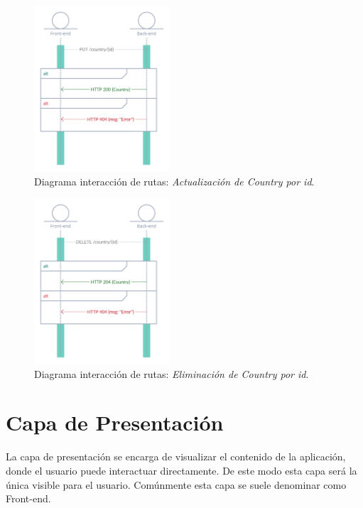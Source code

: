 \begin{figure}[H]
    \centering
    \myfloatalign
    \includegraphics[width=0.45\textwidth]{gfx/diagrama-itr7.png}
    \caption[Diagrama interacción de rutas (7)]{Diagrama interacción de rutas: \textit{Actualización de Country por id}.}\label{gfx:diagrama-itr7}
\end{figure}

\begin{figure}[H]
    \centering
    \myfloatalign
    \includegraphics[width=0.45\textwidth]{gfx/diagrama-itr8.png}
    \caption[Diagrama interacción de rutas (8)]{Diagrama interacción de rutas: \textit{Eliminación de Country por id}.}\label{gfx:diagrama-itr8}
\end{figure}

\section{Capa de Presentación}
La capa de presentación se encarga de visualizar el contenido de la aplicación, donde el usuario puede interactuar directamente. De este modo esta capa será la única visible para el usuario. Comúnmente esta capa se suele denominar como Front-end.

